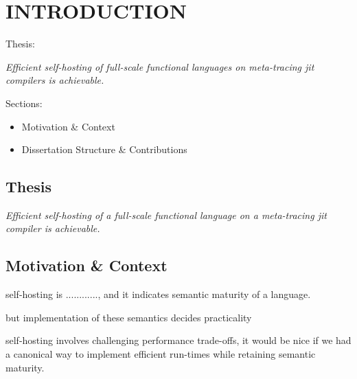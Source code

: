 \chapter[\texorpdfstring{INTRODUCTION}
                          {1. Introduction}]{INTRODUCTION}
    \label{chapter:introduction}

    \begin{chaptersynopsis}

       Thesis:

        \textit{Efficient self-hosting of full-scale functional languages on meta-tracing \gls{jit} compilers is achievable.}

        \vspace{2em}

        Sections:
		\begin{itemize}
			\item Motivation \& Context
			\item Dissertation Structure \& Contributions
		\end{itemize}
    \end{chaptersynopsis}

    \section{Thesis}

    \textit{Efficient self-hosting of a full-scale functional language on a meta-tracing \gls{jit} compiler is achievable.}


    \section[\texorpdfstring{Motivation \& Context}{Context}]{Motivation \& Context}

    \begin{paragraph-here}%
        self-hosting is ............, and it indicates semantic maturity of a language.
    \end{paragraph-here}

    \begin{paragraph-here}%
        but implementation of these semantics decides practicality
    \end{paragraph-here}

    \begin{paragraph-here}%
        self-hosting involves challenging performance trade-offs, it would be nice if we had a canonical way to implement efficient run-times while retaining semantic maturity.
    \end{paragraph-here}


